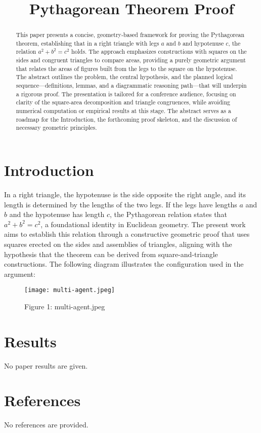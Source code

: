 \documentclass[
]{article}
\title{Pythagorean Theorem Proof}
\author{}
\date{}
\begin{document}
\maketitle

\begin{abstract}
This paper presents a concise, geometry-based framework for proving the Pythagorean theorem, establishing that in a right triangle with legs $a$ and $b$ and hypotenuse $c$, the relation $a^2 + b^2 = c^2$ holds. The approach emphasizes constructions with squares on the sides and congruent triangles to compare areas, providing a purely geometric argument that relates the areas of figures built from the legs to the square on the hypotenuse. The abstract outlines the problem, the central hypothesis, and the planned logical sequence—definitions, lemmas, and a diagrammatic reasoning path—that will underpin a rigorous proof. The presentation is tailored for a conference audience, focusing on clarity of the square-area decomposition and triangle congruences, while avoiding numerical computation or empirical results at this stage. The abstract serves as a roadmap for the Introduction, the forthcoming proof skeleton, and the discussion of necessary geometric principles.
\end{abstract}

\section{Introduction}
In a right triangle, the hypotenuse is the side opposite the right angle, and its length is determined by the lengths of the two legs. If the legs have lengths $a$ and $b$ and the hypotenuse has length $c$, the Pythagorean relation states that $a^2 + b^2 = c^2$, a foundational identity in Euclidean geometry. The present work aims to establish this relation through a constructive geometric proof that uses squares erected on the sides and assemblies of triangles, aligning with the hypothesis that the theorem can be derived from square-and-triangle constructions. The following diagram illustrates the configuration used in the argument:

\begin{figure}[htbp]
  \centering
  \texttt{[image: multi-agent.jpeg]}
  \caption{Figure 1: multi-agent.jpeg}
  \label{fig:multi-agent}
\end{figure}

\section{Results}
No paper results are given.

\section{References}
No references are provided.
\end{document}
